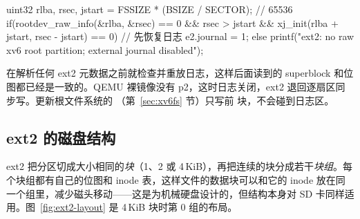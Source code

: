 \begin{ccode}
uint32 rlba, rsec, jstart = FSSIZE * (BSIZE / SECTOR);     // 65536
if(rootdev_raw_info(&rlba, &rsec) == 0 && rsec > jstart &&
   xj_init(rlba + jstart, rsec - jstart) == 0)               // 先恢复日志
  e2.journal = 1;
else
  printf("ext2: no raw xv6 root partition; external journal disabled\n");
\end{ccode}

 在解析任何 ext2 元数据之前就检查并重放日志，这样后面读到的 superblock 和位图都已经是一致的。QEMU 裸镜像没有 p2，这时日志关闭，ext2 退回逐扇区同步写。更新根文件系统的 （第~\ref{sec:xv6fs} 节）只写前  块，不会碰到日志区。

\subsection{ext2 的磁盘结构}

ext2 把分区切成大小相同的\emph{块}（1、2 或 4\,KiB），再把连续的块分成若干\emph{块组}。每个块组都有自己的位图和 inode 表，这样文件的数据块可以和它的 inode 放在同一个组里，减少磁头移动——这是为机械硬盘设计的，但结构本身对 SD 卡同样适用。图~\ref{fig:ext2-layout} 是 4\,KiB 块时第 0 组的布局。

